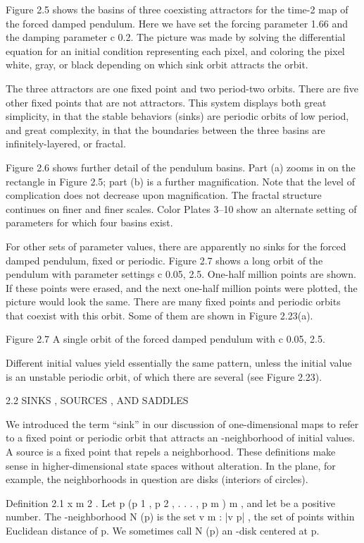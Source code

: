 \documentclass[12pt]{article}
\begin{document}
Figure 2.5 shows the basins of three coexisting attractors for the time-2  map of the forced damped pendulum. Here we have set the 
forcing parameter 
  1.66 and the damping parameter c  0.2. The picture was made by solving the differential equation for an initial condition 
representing each pixel, and coloring the pixel white, gray, or black depending on which sink orbit attracts the orbit.

The three attractors are one ﬁxed point and two period-two orbits. There are ﬁve other ﬁxed points that are not attractors. This 
system displays both great simplicity, in that the stable behaviors (sinks) are periodic orbits of low period, and great complexity, 
in that the boundaries between the three basins are inﬁnitely-layered, or fractal.

Figure 2.6 shows further detail of the pendulum basins. Part (a) zooms in on the rectangle in Figure 2.5; part (b) is a further 
magniﬁcation. Note that the level of complication does not decrease upon magniﬁcation. The fractal structure continues on ﬁner and 
ﬁner scales. Color Plates 3–10 show an alternate setting of parameters for which four basins exist.

For other sets of parameter values, there are apparently no sinks for the forced damped pendulum, ﬁxed or periodic. Figure 2.7 shows 
a long orbit of the pendulum with parameter settings c  0.05, 
  2.5. One-half million points are shown. If these points were erased, and the next one-half million points were plotted, the picture 
would look the same. There are many ﬁxed points and periodic orbits that coexist with this orbit. Some of them are shown in Figure 
2.23(a).


Figure 2.7 A single orbit of the forced damped pendulum with c  0.05,   2.5.

Different initial values yield essentially the same pattern, unless the initial value is an unstable periodic orbit, of which there 
are several (see Figure 2.23).


2.2 SINKS , SOURCES , AND SADDLES

We introduced the term “sink” in our discussion of one-dimensional maps to refer to a ﬁxed point or periodic orbit that attracts an  
-neighborhood of initial values. A source is a ﬁxed point that repels a neighborhood. These deﬁnitions make sense in 
higher-dimensional state spaces without alteration. In the plane, for example, the neighborhoods in question are disks (interiors of 
circles).

Definition 2.1  x m 2 . Let p  (p 1 , p 2 , . . . , p m )   m , and let  be a positive number. The -neighborhood N  (p) is the set  v   
m : |v  p|    
, the set of points within Euclidean distance  of p. We sometimes call N  (p) an -disk centered at p.
\end{document}
